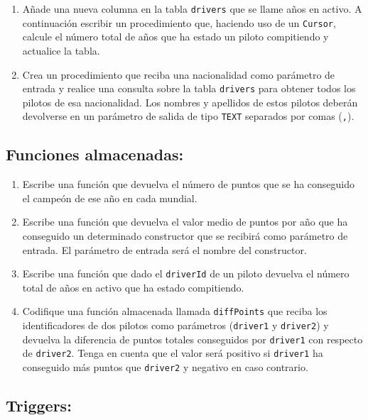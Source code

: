\documentclass{db-practice}
\begin{document}
\begin{enumerate}
    \item Añade una nueva columna en la tabla \texttt{drivers} que se llame años en activo. A continuación escribir un procedimiento que, haciendo uso de un \texttt{Cursor}, calcule el número total de años que ha estado un piloto compitiendo y actualice la tabla.

    \item Crea un procedimiento que reciba una nacionalidad como parámetro de entrada y realice una consulta sobre la tabla \texttt{drivers} para obtener todos los pilotos de esa nacionalidad. Los nombres y apellidos de estos pilotos deberán devolverse en un parámetro de salida de tipo \texttt{TEXT} separados por comas (\texttt{,}).
\end{enumerate}


\subsection{Funciones almacenadas:}

\begin{enumerate}
    \item Escribe una función que devuelva el número de puntos que se ha conseguido el campeón de ese año en cada mundial.
       
    \item Escribe una función que devuelva el valor medio de puntos por año que ha conseguido un determinado constructor que se recibirá como parámetro de entrada. El parámetro de entrada será el nombre del constructor.
            
    \item Escribe una función que dado el \texttt{driverId} de un piloto devuelva el número total de años en activo que ha estado compitiendo.

    \item Codifique una función almacenada llamada \texttt{diffPoints} que reciba los identificadores de dos pilotos como parámetros (\texttt{driver1} y \texttt{driver2}) y devuelva la diferencia de puntos totales conseguidos por \texttt{driver1} con respecto de \texttt{driver2}. Tenga en cuenta que el valor será positivo si \texttt{driver1} ha conseguido más puntos que \texttt{driver2} y negativo en caso contrario.
\end{enumerate}

\subsection{Triggers:}
\end{document}
